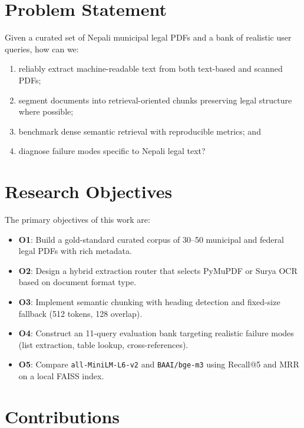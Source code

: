 \section{Problem Statement}
\label{sec:problem}

Given a curated set of Nepali municipal legal PDFs and a bank of realistic user queries, how can we:
\begin{enumerate}[leftmargin=*]
  \item reliably extract machine-readable text from both text-based and scanned PDFs;
  \item segment documents into retrieval-oriented chunks preserving legal structure where possible;
  \item benchmark dense semantic retrieval with reproducible metrics; and
  \item diagnose failure modes specific to Nepali legal text?
\end{enumerate}

\section{Research Objectives}
\label{sec:objectives}

The primary objectives of this work are:
\begin{itemize}[leftmargin=*]
  \item \textbf{O1}: Build a gold-standard curated corpus of 30--50 municipal and federal legal PDFs with rich metadata.
  \item \textbf{O2}: Design a hybrid extraction router that selects PyMuPDF or Surya OCR based on document format type.
  \item \textbf{O3}: Implement semantic chunking with heading detection and fixed-size fallback (512 tokens, 128 overlap).
  \item \textbf{O4}: Construct an 11-query evaluation bank targeting realistic failure modes (list extraction, table lookup, cross-references).
  \item \textbf{O5}: Compare \texttt{all-MiniLM-L6-v2} and \texttt{BAAI/bge-m3} using Recall@5 and MRR on a local FAISS index.
\end{itemize}

\section{Contributions}
\label{sec:contributions}

